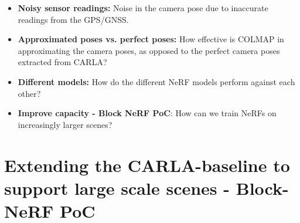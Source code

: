 \begin{itemize}
    \item \textbf{Noisy sensor readings:} Noise in the camera pose due to inaccurate readings from the GPS/GNSS.
    \item \textbf{Approximated poses vs. perfect poses:} How effective is COLMAP in approximating the camera poses, as opposed to the perfect camera poses extracted from CARLA?
    \item \textbf{Different models:} How do the different NeRF models perform against each other?
    \item \textbf{Improve capacity - Block NeRF PoC}: How can we train NeRFs on increasingly larger scenes?
\end{itemize}




















































\section{Extending the CARLA-baseline to support large scale scenes - Block-NeRF PoC} \label{sec:method-block-nerf}

\begin{comment}
Premise: Have found the CARLA-baseline to work well on shorter segments. As discussed multiple papers, the capacity is limited.
Premise \#2: Since I operate in a synthetic environment, I have perfect poses which simplifies the process.
Question: How do I implement Block-NeRF in Nerfstudio, given perfect poses?

\begin{itemize}
    \item Split the dataset into multiple datasets
    \item Train each seperately
    \item Create a camera path
    \item Render the camera path for each NeRF
\end{itemize}
\end{comment}

